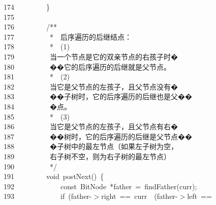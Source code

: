 \documentclass[11pt,a4paper]{ctexart}
\newcommand{\hlstd}[1]{\textcolor[rgb]{0.2,0.2,0.2}{#1}}
\newcommand{\hlcom}[1]{\textcolor[rgb]{0.59,0.59,0.59}{#1}}
\newcommand{\hlopt}[1]{\textcolor[rgb]{0.2,0.2,0.2}{#1}}
\newcommand{\hllin}[1]{\textcolor[rgb]{0.59,0.59,0.59}{#1}}
\newcommand{\hlkwa}[1]{\textcolor[rgb]{0.23,0.42,0.78}{#1}}
\newcommand{\hlkwb}[1]{\textcolor[rgb]{0.63,0,0.31}{#1}}
\newcommand{\hlkwd}[1]{\textcolor[rgb]{0.78,0.23,0.41}{#1}}
\begin{document}
\hllin{174\ }\hlstd{}\hlstd{\ \ \ \ \ \ \ \ }\hlstd{}\hlopt{\}}\\
\hllin{175\ }\hlstd{}\\
\hllin{176\ }\hlstd{}\hlstd{\ \ \ \ \ \ \ \ }\hlstd{}\hlcom{/{*}{*}}\\
\hllin{177\ }\hlcom{}\hlstd{\ \ \ \ \ \ \ \ \ }\hlcom{{*}}\hlstd{\ \ }\hlcom{后序遍历的后继结点：}\\
\hllin{178\ }\hlcom{}\hlstd{\ \ \ \ \ \ \ \ \ }\hlcom{{*}}\hlstd{\ \ }\hlcom{(1)}\Righttorque\\
\hllin{179\ }\hlcom{}\hlstd{\ \ \ \ \ \ \ \ \ }\hlcom{当一个节点是它的双亲节点的右孩子时�}\Righttorque\\
\hllin{180\ }\hlcom{}\hlstd{\ \ \ \ \ \ \ \ \ }\hlcom{��它的后序遍历的后继就是父节点。}\\
\hllin{181\ }\hlcom{}\hlstd{\ \ \ \ \ \ \ \ \ }\hlcom{{*}}\hlstd{\ \ }\hlcom{(2)}\Righttorque\\
\hllin{182\ }\hlcom{}\hlstd{\ \ \ \ \ \ \ \ \ }\hlcom{当它是父节点的左孩子，且父节点没有�}\Righttorque\\
\hllin{183\ }\hlcom{}\hlstd{\ \ \ \ \ \ \ \ \ }\hlcom{��子树时，它的后序遍历的后继也是父��}\Righttorque\\
\hllin{184\ }\hlcom{}\hlstd{\ \ \ \ \ \ \ \ \ }\hlcom{�点。}\\
\hllin{185\ }\hlcom{}\hlstd{\ \ \ \ \ \ \ \ \ }\hlcom{{*}}\hlstd{\ \ }\hlcom{(3)}\Righttorque\\
\hllin{186\ }\hlcom{}\hlstd{\ \ \ \ \ \ \ \ \ }\hlcom{当它是父节点的左孩子，且父节点有右�}\Righttorque\\
\hllin{187\ }\hlcom{}\hlstd{\ \ \ \ \ \ \ \ \ }\hlcom{��树时，它的后序遍历的后继是父节点��}\Righttorque\\
\hllin{188\ }\hlcom{}\hlstd{\ \ \ \ \ \ \ \ \ }\hlcom{�子树中的最左节点（如果左子树为空，}\Righttorque\\
\hllin{189\ }\hlcom{}\hlstd{\ \ \ \ \ \ \ \ \ }\hlcom{右子树不空，则为右子树的最左节点）}\\
\hllin{190\ }\hlcom{}\hlstd{\ \ \ \ \ \ \ \ \ }\hlcom{{*}/}\hlstd{}\\
\hllin{191\ }\hlstd{}\hlstd{\ \ \ \ \ \ \ \ }\hlstd{}\hlkwb{void\ }\hlstd{}\hlkwd{postNext}\hlstd{}\hlopt{()\ \{}\\
\hllin{192\ }\hlstd{}\hlstd{\ \ \ \ \ \ \ \ \ \ \ \ }\hlstd{}\hlkwb{const\ }\hlstd{BitNode\ }\hlopt{{*}}\hlstd{father\ }\hlopt{=\ }\hlstd{}\hlkwd{findFather}\hlstd{}\hlopt{(}\hlstd{curr}\hlopt{);}\\
\hllin{193\ }\hlstd{}\hlstd{\ \ \ \ \ \ \ \ \ \ \ \ }\hlstd{}\hlkwa{if\ }\hlstd{}\hlopt{(}\hlstd{father}\hlopt{{-}$>$}\hlstd{right\ }\hlopt{==\ }\hlstd{curr\ }\hlopt{\textbar \textbar \ (}\hlstd{father}\hlopt{{-}$>$}\hlstd{left\ }\hlopt{==\ }\Righttorque\\
\end{document}
